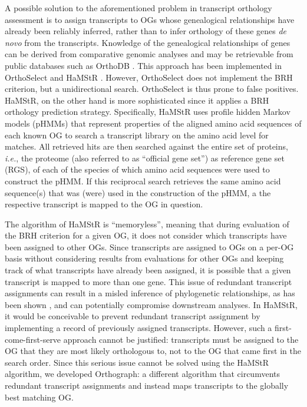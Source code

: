 A possible solution to the aforementioned problem in transcript
orthology assessment is to assign transcripts to OGs whose genealogical
relationships have already been reliably inferred, rather than to infer
orthology of these genes \emph{de novo} from the transcripts. Knowledge
of the genealogical relationships of genes can be derived from
comparative genomic analyses and may be retrievable from public
databases such as OrthoDB \cite{Kriventseva2015}. This approach has
been implemented in OrthoSelect \cite{Schreiber2009} and HaMStR
\cite{Ebersberger2009}. However, OrthoSelect does not implement the BRH
criterion, but a unidirectional search. OrthoSelect is thus prone to
false positives. HaMStR, on the other hand is more sophisticated since
it applies a BRH orthology prediction strategy. Specifically, HaMStR
uses profile hidden Markov models (pHMMs) that represent properties of
the aligned amino acid sequences of each known OG to search a transcript
library on the amino acid level for matches. All retrieved hits are then
searched against the entire set of proteins, \emph{i.e.}, the proteome
(also referred to as ``official gene set'') as reference gene set (RGS),
of each of the species of which amino acid sequences were used to
construct the pHMM. If this reciprocal search retrieves the same amino
acid sequence(s) that was (were) used in the construction of the pHMM, a
the respective transcript is mapped to the OG in question.

The algorithm of HaMStR is ``memoryless'', meaning that during
evaluation of the BRH criterion for a given OG, it does not consider
which transcripts have been assigned to other OGs. Since transcripts are
assigned to OGs on a per-OG basis without considering results from
evaluations for other OGs and keeping track of what transcripts have
already been assigned, it is possible that a given transcript is mapped
to more than one gene. This issue of redundant transcript assignments
can result in a misled inference of phylogenetic relationships, as has
been shown \cite{Struck2011,Kvist2013}, and can potentially compromise
downstream analyses. In HaMStR, it would be conceivable to prevent
redundant transcript assignment by implementing a record of previously
assigned transcripts. However, such a first-come-first-serve approach
cannot be justified: transcripts must be assigned to the OG that they
are most likely orthologous to, not to the OG that came first in the
search order. Since this serious issue cannot be solved using the HaMStR
algorithm, we developed Orthograph: a different algorithm that
circumvents redundant transcript assignments and instead maps
transcripts to the globally best matching OG.

